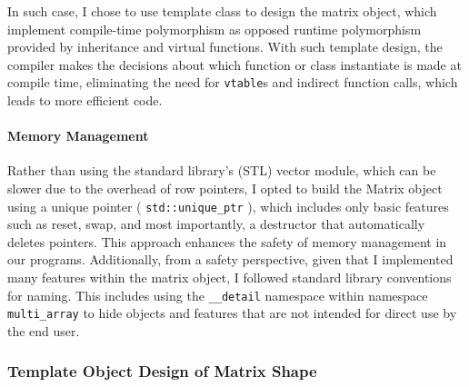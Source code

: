 In such case, I chose to use template class to design the matrix object, which implement compile-time polymorphism as opposed runtime polymorphism
provided by inheritance and virtual functions. 
With such template design, the compiler makes the decisions about which function or class instantiate is made at compile time, eliminating 
the need for \texttt{vtable}s and indirect function calls, which leads to more efficient code. 

\paragraph{Memory Management}
Rather than using the standard library's (STL) vector module, 
which can be slower due to the overhead of row pointers, 
I opted to build the Matrix object using a unique pointer 
(
  \texttt{std::unique\_ptr}
), which includes only basic features such as reset, swap, and most importantly, 
a destructor that automatically deletes pointers. 
This approach enhances the safety of memory management in our programs.
Additionally, from a safety perspective, 
given that I implemented many features within the matrix object, 
I followed standard library conventions for naming. 
This includes using the \texttt{\_\_detail} namespace within namespace \texttt{multi\_array} to 
hide objects and features that are not intended for direct use by the end user.

\subsubsection{Template Object Design of Matrix Shape}

